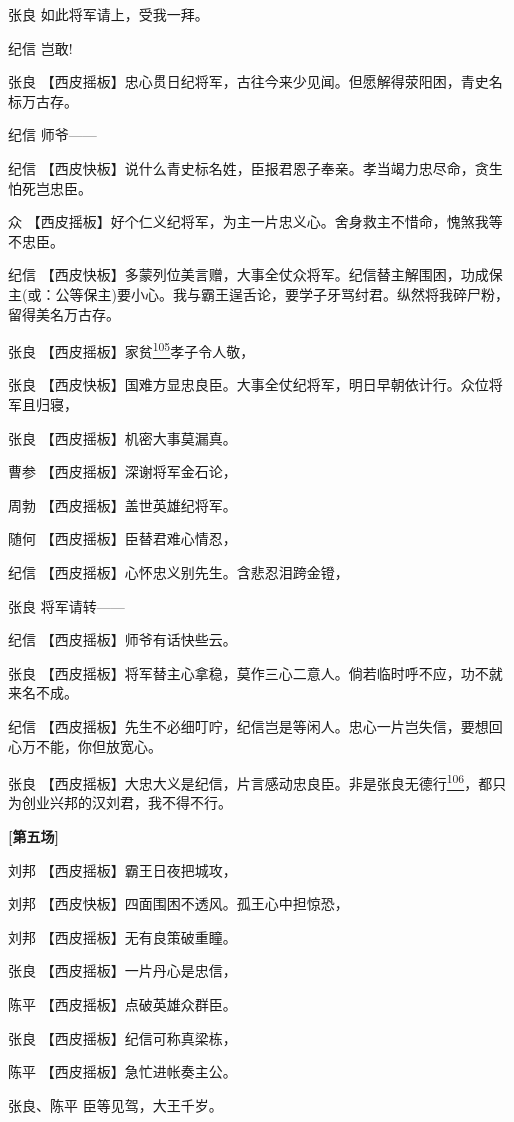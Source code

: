 张良 如此将军请上，受我一拜。

纪信 岂敢!

张良
【西皮摇板】忠心贯日纪将军，古往今来少见闻。但愿解得荥阳困，青史名标万古存。

纪信 师爷------

纪信
【西皮快板】说什么青史标名姓，臣报君恩子奉亲。孝当竭力忠尽命，贪生怕死岂忠臣。

众
【西皮摇板】好个仁义纪将军，为主一片忠义心。舍身救主不惜命，愧煞我等不忠臣。

纪信
【西皮快板】多蒙列位美言赠，大事全仗众将军。纪信替主解围困，功成保主(或：公等保主)要小心。我与霸王逞舌论，要学子牙骂纣君。纵然将我碎尸粉，留得美名万古存。

张良
【西皮摇板】家贫\protect\hyperlink{fn105}{\textsuperscript{105}}孝子令人敬，

张良
【西皮快板】国难方显忠良臣。大事全仗纪将军，明日早朝依计行。众位将军且归寝，

张良 【西皮摇板】机密大事莫漏真。

曹参 【西皮摇板】深谢将军金石论，

周勃 【西皮摇板】盖世英雄纪将军。

随何 【西皮摇板】臣替君难心情忍，

纪信 【西皮摇板】心怀忠义别先生。含悲忍泪跨金镫，

张良 将军请转------

纪信 【西皮摇板】师爷有话快些云。

张良
【西皮摇板】将军替主心拿稳，莫作三心二意人。倘若临时呼不应，功不就来名不成。

纪信
【西皮摇板】先生不必细叮咛，纪信岂是等闲人。忠心一片岂失信，要想回心万不能，你但放宽心。

张良
【西皮摇板】大忠大义是纪信，片言感动忠良臣。非是张良无德行\protect\hyperlink{fn106}{\textsuperscript{106}}，都只为创业兴邦的汉刘君，我不得不行。

\textbf{{[}第五场{]}}

刘邦 【西皮摇板】霸王日夜把城攻，

刘邦 【西皮快板】四面围困不透风。孤王心中担惊恐，

刘邦 【西皮摇板】无有良策破重瞳。

张良 【西皮摇板】一片丹心是忠信，

陈平 【西皮摇板】点破英雄众群臣。

张良 【西皮摇板】纪信可称真梁栋，

陈平 【西皮摇板】急忙进帐奏主公。

张良、陈平 臣等见驾，大王千岁。

